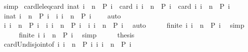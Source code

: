 \begin{isabellebody}
\ simp\isanewline
{}\isamarkupfalse%
%
\endisatagproof
{\isafoldproof}%
%
\isadelimproof
\isanewline
%
\endisadelimproof
\isanewline
{}\isamarkupfalse%
\ card{\isacharunderscore}le{\isacharunderscore}leq{\isacharunderscore}{}{\isacharcolon}{\isacartoucheopen}card\ {\isacharbraceleft}i{\isacharcolon}{\isacharcolon}nat{\isachardot}\ i\ {\isasymle}\ n\ {\isasymand}\ P\ i{\isacharbraceright}\ {\isacharequal}\ card\ {\isacharbraceleft}i{\isachardot}\ i\ {\isacharless}\ n\ {\isasymand}\ P\ i{\isacharbraceright}\ {\isacharplus}\ card\ {\isacharbraceleft}i{\isachardot}\ i\ {\isacharequal}\ n\ {\isasymand}\ P\ i{\isacharbraceright}{\isacartoucheclose}\isanewline
%
\isadelimproof
%
\endisadelimproof
%
\isatagproof
{}\isamarkupfalse%
\ {\isacharminus}\isanewline
\ \ \isamarkupfalse%
\ {\isacartoucheopen}{\isacharbraceleft}i{\isacharcolon}{\isacharcolon}nat{\isachardot}\ i\ {\isacharless}\ n\ {\isasymand}\ P\ i{\isacharbraceright}\ {\isasyminter}\ {\isacharbraceleft}i{\isachardot}\ i\ {\isacharequal}\ n\ {\isasymand}\ P\ i{\isacharbraceright}\ {\isacharequal}\ {\isacharbraceleft}{\isacharbraceright}{\isacartoucheclose}\ \isamarkupfalse%
\ auto\isanewline
\ \ \isamarkupfalse%
\ \isamarkupfalse%
\ {\isacartoucheopen}{\isacharbraceleft}i{\isachardot}\ i\ {\isacharless}\ n\ {\isasymand}\ P\ i{\isacharbraceright}\ {\isasymunion}\ {\isacharbraceleft}i{\isachardot}\ i\ {\isacharequal}\ n\ {\isasymand}\ P\ i{\isacharbraceright}\ {\isacharequal}\ {\isacharbraceleft}i{\isachardot}\ i\ {\isasymle}\ n\ {\isasymand}\ P\ i{\isacharbraceright}{\isacartoucheclose}\ \isamarkupfalse%
\ auto\isanewline
\ \ \isamarkupfalse%
\ \isamarkupfalse%
\ {\isacartoucheopen}finite\ {\isacharbraceleft}i{\isachardot}\ i\ {\isacharless}\ n\ {\isasymand}\ P\ i{\isacharbraceright}{\isacartoucheclose}\ \isamarkupfalse%
\ simp\isanewline
\ \ \isamarkupfalse%
\ \isamarkupfalse%
\ {\isacartoucheopen}finite\ {\isacharbraceleft}i{\isachardot}\ i\ {\isacharequal}\ n\ {\isasymand}\ P\ i{\isacharbraceright}{\isacartoucheclose}\ \isamarkupfalse%
\ simp\isanewline
\ \ \isamarkupfalse%
\ \isamarkupfalse%
\ {\isacharquery}thesis\ \isamarkupfalse%
\ card{\isacharunderscore}Un{\isacharunderscore}disjoint{\isacharbrackleft}of\ {\isacartoucheopen}{\isacharbraceleft}i{\isachardot}\ i\ {\isacharless}\ n\ {\isasymand}\ P\ i{\isacharbraceright}{\isacartoucheclose}\ {\isacartoucheopen}{\isacharbraceleft}i{\isachardot}\ i\ {\isacharequal}\ n\ {\isasymand}\ P\ i{\isacharbraceright}{\isacartoucheclose}{\isacharbrackright}\ \isamarkupfalse%

\end{isabellebody}
